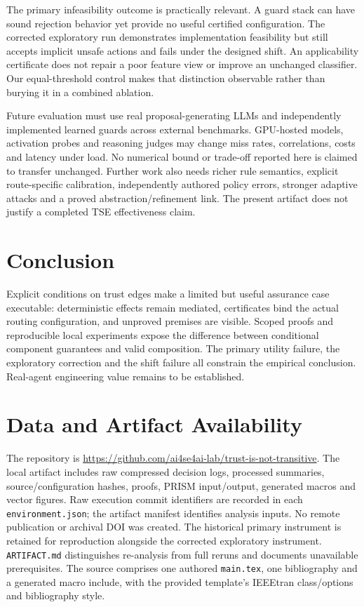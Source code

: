 ﻿\documentclass[lettersize,journal]{IEEEtran}
\begin{document}
The primary infeasibility outcome is practically relevant. A guard stack can
have sound rejection behavior yet provide no useful certified configuration.
The corrected exploratory run demonstrates implementation feasibility but
still accepts implicit unsafe actions and fails under the designed shift.
An applicability certificate does not repair a poor feature view or improve
an unchanged classifier. Our equal-threshold control makes that distinction
observable rather than burying it in a combined ablation.

Future evaluation must use real proposal-generating LLMs and independently
implemented learned guards across external benchmarks. GPU-hosted models,
activation probes and reasoning judges may change miss rates, correlations,
costs and latency under load. No numerical bound or trade-off reported here
is claimed to transfer unchanged. Further work also needs richer rule
semantics, explicit route-specific calibration, independently authored policy
errors, stronger adaptive attacks and a proved abstraction/refinement link.
The present artifact does not justify a completed TSE effectiveness claim.

\section{Conclusion}
Explicit conditions on trust edges make a limited but useful assurance case
executable: deterministic effects remain mediated, certificates bind the
actual routing configuration, and unproved premises are visible. Scoped
proofs and reproducible local experiments expose the difference between
conditional component guarantees and valid composition. The primary utility
failure, the exploratory correction and the shift failure all constrain the
empirical conclusion. Real-agent engineering value remains to be established.

\section*{Data and Artifact Availability}
The repository is \url{https://github.com/ai4se4ai-lab/trust-is-not-transitive}.
The local artifact includes raw compressed decision logs, processed summaries,
source/configuration hashes, proofs, PRISM input/output, generated macros and
vector figures. Raw execution commit identifiers are recorded in each
\texttt{environment.json}; the artifact manifest identifies analysis inputs.
No remote publication or archival DOI was created. The historical primary
instrument is retained for reproduction alongside the corrected exploratory
instrument. \texttt{ARTIFACT.md} distinguishes re-analysis from full reruns and
documents unavailable prerequisites. The source comprises one authored
\texttt{main.tex}, one bibliography and a generated macro include, with the
provided template's IEEEtran class/options and bibliography style.
\end{document}

